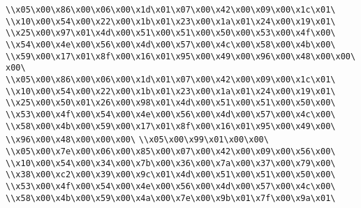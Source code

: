\verb|\\x05\x00\x86\x00\x06\x00\x1d\x01\x07\x00\x42\x00\x09\x00\x1c\x01\|\newline
\verb|\\x10\x00\x54\x00\x22\x00\x1b\x01\x23\x00\x1a\x01\x24\x00\x19\x01\|\newline
\verb|\\x25\x00\x97\x01\x4d\x00\x51\x00\x51\x00\x50\x00\x53\x00\x4f\x00\|\newline
\verb|\\x54\x00\x4e\x00\x56\x00\x4d\x00\x57\x00\x4c\x00\x58\x00\x4b\x00\|\newline
\verb|\\x59\x00\x17\x01\x8f\x00\x16\x01\x95\x00\x49\x00\x96\x00\x48\x00\x00\x00\|\newline
\verb|\\x05\x00\x86\x00\x06\x00\x1d\x01\x07\x00\x42\x00\x09\x00\x1c\x01\|\newline
\verb|\\x10\x00\x54\x00\x22\x00\x1b\x01\x23\x00\x1a\x01\x24\x00\x19\x01\|\newline
\verb|\\x25\x00\x50\x01\x26\x00\x98\x01\x4d\x00\x51\x00\x51\x00\x50\x00\|\newline
\verb|\\x53\x00\x4f\x00\x54\x00\x4e\x00\x56\x00\x4d\x00\x57\x00\x4c\x00\|\newline
\verb|\\x58\x00\x4b\x00\x59\x00\x17\x01\x8f\x00\x16\x01\x95\x00\x49\x00\|\newline
\verb|\\x96\x00\x48\x00\x00\x00\|\newline
\verb|\\x05\x00\x99\x01\x00\x00\|\newline
\verb|\\x05\x00\x7e\x00\x06\x00\x85\x00\x07\x00\x42\x00\x09\x00\x56\x00\|\newline
\verb|\\x10\x00\x54\x00\x34\x00\x7b\x00\x36\x00\x7a\x00\x37\x00\x79\x00\|\newline
\verb|\\x38\x00\xc2\x00\x39\x00\x9c\x01\x4d\x00\x51\x00\x51\x00\x50\x00\|\newline
\verb|\\x53\x00\x4f\x00\x54\x00\x4e\x00\x56\x00\x4d\x00\x57\x00\x4c\x00\|\newline
\verb|\\x58\x00\x4b\x00\x59\x00\x4a\x00\x7e\x00\x9b\x01\x7f\x00\x9a\x01\|\newline
